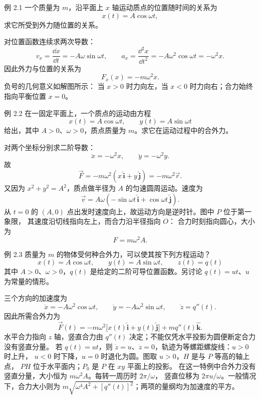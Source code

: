 

\begin{origexamplebox}{例 2.1}
一个质量为 $m$，沿平面上 $x$ 轴运动质点的位置随时间的关系为
\[
  x(t)=A\cos\omega t,
\]
求它所受到外力随位置的关系。
\end{origexamplebox}

\begin{xesolution}
对位置函数连续求两次导数：
\[
  v_x=\frac{\dd x}{\dd t}=-A\omega\sin\omega t,
  \qquad
  a_x=\frac{\dd^2x}{\dd t^2}=-A\omega^2\cos\omega t=-\omega^2x.
\]
因此外力与位置的关系为
\[
  \boxed{F_x(x)=-m\omega^2x}.
\]
负号的几何意义如解图所示：
\soldiagTwoOne
当 $x>0$ 时力向左，当 $x<0$ 时力向右；合力始终指向平衡位置 $x=0$。
\end{xesolution}

\begin{origexamplebox}{例 2.2}
在一固定平面上，一个质点的运动由方程
\[
  x(t)=A\cos\omega t,
  \qquad
  y(t)=A\sin\omega t
\]
给出，其中 $A>0$、$\omega>0$，质点质量为 $m$。求它在运动过程中的合外力。
\end{origexamplebox}

\begin{xesolution}
对两个坐标分别求二阶导数：
\[
  \ddot x=-\omega^2x,
  \qquad
  \ddot y=-\omega^2y.
\]
故
\[
  \boxed{\vec F=-m\omega^2(x\,\hat{\boldsymbol i}+y\,\hat{\boldsymbol j})
  =-m\omega^2\vec r}.
\]
又因为 $x^2+y^2=A^2$，质点做半径为 $A$ 的匀速圆周运动。速度为
\[
 \vec v=A\omega(-\sin\omega t\,\hat{\boldsymbol i}
 +\cos\omega t\,\hat{\boldsymbol j}).
\]
从 $t=0$ 的 $(A,0)$ 点出发时速度向上，故运动方向是逆时针。图中 $P$ 位于第一象限，
其速度沿切线指向左上，而合力沿半径指向 $O$：
\soldiagTwoTwo
合力时刻指向圆心，大小为
\[
  \boxed{F=m\omega^2A}.
\]
\end{xesolution}

\begin{origexamplebox}{例 2.3}
质量为 $m$ 的物体受何种合外力，可以使其按下列方程运动？
\[
  x(t)=A\cos\omega t,
  \qquad y(t)=A\sin\omega t,
  \qquad z(t)=q(t)
\]
其中 $A>0$、$\omega>0$，$q(t)$ 是给定的二阶可导位置函数。另讨论 $q(t)=ut$、$u$ 为常量的情形。
\end{origexamplebox}

\begin{xesolution}
三个方向的加速度为
\[
  \ddot x=-A\omega^2\cos\omega t,
  \qquad
  \ddot y=-A\omega^2\sin\omega t,
  \qquad
  \ddot z=q''(t).
\]
因此所需合外力为
\[
  \boxed{\vec F(t)=
  -m\omega^2\bigl[x(t)\hat{\boldsymbol i}+y(t)\hat{\boldsymbol j}\bigr]
  +mq''(t)\hat{\boldsymbol k}}.
\]
水平合力指向 $z$ 轴，竖直合力由 $q''(t)$ 决定；不能仅凭水平投影为圆便断定合力没有竖直分量。
若 $q(t)=ut$，则 $\dot z=u$、$\ddot z=0$，轨迹为等螺距螺旋线：$u>0$ 时上升，
$u<0$ 时下降，$u=0$ 时退化为圆。图取 $u>0$，$H$ 是与 $P$ 等高的轴上点，
$PH$ 位于水平面内；$P_0$ 是 $P$ 在 $xy$ 平面上的投影。
\soldiagTwoThree
在这一特例中合外力没有竖直分量，大小恒为 $m\omega^2A$。每转一周历时 $2\pi/\omega$，
竖直位移为 $2\pi u/\omega$。一般情况下，合力大小则为
$m\sqrt{\omega^4A^2+[q''(t)]^2}$；两项的量纲均为加速度的平方。
\end{xesolution}

